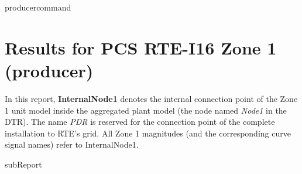{{ producercommand }}



    \section{Results for PCS RTE-I16 Zone 1 ({{producer}})}

    In this report, \textbf{InternalNode1} denotes the internal connection point of the
    Zone 1 unit model inside the aggregated plant model (the node named \emph{Node1} in
    the DTR). The name \emph{PDR} is reserved for the connection point of the complete
    installation to RTE's grid. All Zone 1 magnitudes (and the corresponding curve signal
    names) refer to InternalNode1.

    {{subReport}}
    \newpage


